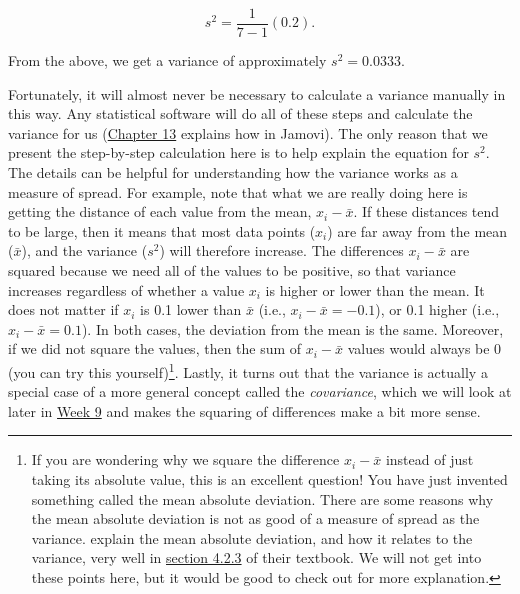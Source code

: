 \documentclass[
]{scrbook}
\begin{document}
\[s^{2} = \frac{1}{7 - 1}\left(0.2\right).\]

From the above, we get a variance of approximately \(s^{2} = 0.0333\).

Fortunately, it will almost never be necessary to calculate a variance manually in this way.
Any statistical software will do all of these steps and calculate the variance for us (\protect\hyperlink{Chapter_13}{Chapter 13} explains how in Jamovi).
The only reason that we present the step-by-step calculation here is to help explain the equation for \(s^{2}\).
The details can be helpful for understanding how the variance works as a measure of spread.
For example, note that what we are really doing here is getting the distance of each value from the mean, \(x_{i} - \bar{x}\).
If these distances tend to be large, then it means that most data points (\(x_{i}\)) are far away from the mean (\(\bar{x}\)), and the variance (\(s^{2}\)) will therefore increase.
The differences \(x_{i} - \bar{x}\) are squared because we need all of the values to be positive, so that variance increases regardless of whether a value \(x_{i}\) is higher or lower than the mean.
It does not matter if \(x_{i}\) is 0.1 lower than \(\bar{x}\) (i.e., \(x_{i} - \bar{x} = -0.1\)), or 0.1 higher (i.e., \(x_{i} - \bar{x} = 0.1\)).
In both cases, the deviation from the mean is the same.
Moreover, if we did not square the values, then the sum of \(x_{i} - \bar{x}\) values would always be 0 (you can try this yourself)\footnote{If you are wondering why we square the difference \(x_{i} - \bar{x}\) instead of just taking its absolute value, this is an excellent question! You have just invented something called the mean absolute deviation. There are some reasons why the mean absolute deviation is not as good of a measure of spread as the variance. \citet{Navarro2022} explain the mean absolute deviation, and how it relates to the variance, very well in \href{https://davidfoxcroft.github.io/lsj-book/04-Descriptive-statistics.html\#mean-absolute-deviation}{section 4.2.3} of their textbook. We will not get into these points here, but it would be good to check out \citet{Navarro2022} for more explanation.}.
Lastly, it turns out that the variance is actually a special case of a more general concept called the \emph{covariance}, which we will look at later in \protect\hyperlink{Week9}{Week 9} and makes the squaring of differences make a bit more sense.
\end{document}
